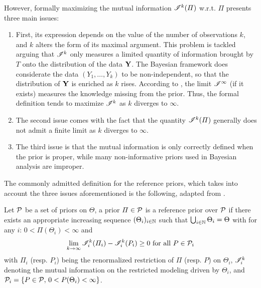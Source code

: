 However, formally maximizing the mutual information $\mathscr{I}^k(\varPi)$ w.r.t. $\varPi$ presents three main issues: %
\begin{enumerate}
    \item First, its expression depends on the value of the number of  observations $k$, and $k$ alters the form of its maximal argument. %
    This problem is tackled arguing that $\mathscr{I}^k$ only measures a limited quantity of information brought by $T$ onto the distribution of the data $\mathbf{Y}$. The Bayesian framework does considerate the data $(Y_1,\dots,Y_k)$ to be non-independent, so that the distribution of $\mathbf{Y}$ is enriched as $k$ rises.
    According to \citet{bernardo_bayesian_1994}, the limit $\mathscr{I}^\infty$ (if it exists) measures the knowledge missing from the prior.
    Thus, the formal definition tends to maximize $\mathscr{I}^k$ as $k$ diverges to $\infty$.
    \item The second issue comes with the fact that the quantity $\mathscr{I}^k(\varPi)$ generally does not admit a finite limit as $k$ diverges to $\infty$.
    \item The third issue is that the mutual information is only correctly defined when the prior is proper, while many non-informative priors used in Bayesian analysis are improper.
\end{enumerate}

The commonly admitted definition for the reference priors, which takes into account the three issues aforementioned is the following, adapted from \cite{dey_reference_2005}.
\begin{defi}\label{def:intro-ref:ref-priors}
    Let $\mathcal{P}$ be a set of priors on $\Theta$, a prior $\varPi\in\mathcal{P}$ %
    is a reference prior over $\mathcal{P}$ if there exists an appropriate increasing sequence $(\Theta_i)_{i\in\mathbb{N}}$ such that $\bigcup_{i\in\mathbb{N}}\Theta_i=\Theta$ with for any $i$: $0<\varPi(\Theta_i)<\infty  $ and
        \begin{equation}
            \lim_{k\rightarrow\infty} \mathscr{I}^k_i(\varPi_i) - \mathscr{I}^k_i(P_i) \geq 0 \text{\ for all\ } P\in\mathcal{P}_i
        \end{equation}
    with $\varPi_i$ (resp. $P_i$) being the renormalized restriction of $\varPi$ (resp. $P$) on $\Theta_i$, $\mathscr{I}_i^k$ denoting the mutual information on the restricted modeling driven by $\Theta_i$, and $\mathcal{P}_i=\{P\in\mathcal{P},\,0<P(\Theta_i)<\infty\}$.
\end{defi}

